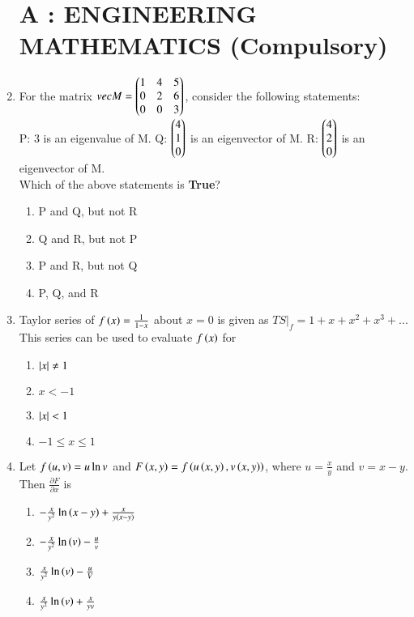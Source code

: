 \documentclass[journal]{IEEEtran}
\numberwithin{equation}{enumi}
\numberwithin{figure}{enumi}
\begin{document}
\begin{enumerate}
\section{A : ENGINEERING MATHEMATICS (Compulsory)}
\item For the matrix $vec{M} = \begin{pmatrix}1 & 4 & 5\\
0 & 2 & 6\\
0 & 0 & 3\end{pmatrix}$, consider the following statements: \\
P: 3 is an eigenvalue of M.   Q: $\begin{pmatrix}4\\
1\\
0\end{pmatrix}$ is an eigenvector of M.   R: $\begin{pmatrix}4\\
2\\
0\end{pmatrix}$ is an eigenvector of M. \\
Which of the above statements is \textbf{True}?
\begin{enumerate}
	\item P and Q, but not R
	\item Q and R, but not P
	\item P and R, but not Q
	\item P, Q, and R
\end{enumerate}
\item Taylor series of $f\left(x\right) = \frac{1}{1 - x}$ about $x = 0$ is given as $TS|_f = 1 + x + x^2 + x^3 + ...$ This series can be used to evaluate $f\left(x\right)$ for
	\begin{enumerate}
		\item $\left\vert x\right\vert \neq 1$
		\item $x < -1$
		\item $\left\vert x\right\vert < 1$
		\item $-1 \leq x \leq 1$
	\end{enumerate}
\item Let $f\left(u, v\right) = u\ln{v}$ and $F\left(x, y\right) = f\left(u\left(x, y\right), v\left(x, y\right)\right)$, where $u = \frac{x}{y}$ and $v = x - y$. Then $\frac{\partial F}{\partial x}$ is
	\begin{enumerate}
		\item $-\frac{x}{y^2}\ln{\ensuremath{\left(x - y\right)}} + \frac{x}{y\left(x - y\right)}$
		\item $-\frac{x}{y^2}\ln{\ensuremath{\left(v\right)}} - \frac{u}{v}$
		\item $\frac{x}{y^2}\ln{\ensuremath{\left(v\right)}} - \frac{u}{V}$
		\item $\frac{x}{y^2}\ln{\ensuremath{\left(v\right)}} + \frac{x}{yv}$
	\end{enumerate}

\end{enumerate}
\end{document}
